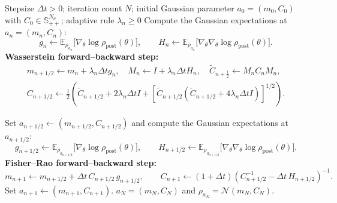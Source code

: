 \documentclass[11pt]{article}
\theoremstyle{plain}
\theoremstyle{definition}
\theoremstyle{remark}
\newcommand{\N}{\mathcal{N}}
\newcommand{\E}{\mathbb{E}}
\newcommand{\post}{\mathrm{post}}
\begin{document}
\begin{algorithm}[t]
\caption{Forward--backward algorithm of Gaussian approximate Wasserstein--Fisher--Rao gradient flow}
\label{alg:fb-fb-wfr-gvi}
\begin{algorithmic}[1]
\Require Stepsize $\Delta t>0$; iteration count $N$; initial Gaussian parameter $a_0=(m_0,C_0)$ with $C_0\in\mathbb S_{++}^{N_\theta}$; adaptive rule $\lambda_n\ge 0$
    \State Compute the Gaussian expectations at $a_n=(m_n,C_n)$:
    \[
        g_n \gets 
        \E_{\rho_{a_n}}
        \bigl[
            \nabla_\theta \log \rho_\post(\theta)
        \bigr],
        \qquad
        H_n \gets 
        \E_{\rho_{a_n}}
        \bigl[
            \nabla_\theta\nabla_\theta \log \rho_\post(\theta)
        \bigr].
    \]
    \State \textbf{Wasserstein forward--backward step:}
    \begin{align*}
        m_{n+1/2} \gets m_n+\lambda_n\Delta t g_n,\quad M_n \gets I+\lambda_n\Delta t H_n, \quad \widetilde C_{n+\frac12} \gets M_n C_n M_n, 
        \\
        C_{n+1/2}
        \gets
        \frac12
        \left(
            \widetilde C_{n+1/2}
            +
            2 \lambda_n\Delta t I
            +
            \left[
                \widetilde C_{n+1/2}
                \left(
                    \widetilde C_{n+1/2}
                    +
                    4 \lambda_n\Delta t I
                \right)
            \right]^{1/2}
        \right).
    \end{align*}

    \State Set $a_{n+1/2} \gets (m_{n+1/2},C_{n+1/2})$ and compute the Gaussian expectations at $a_{n+1/2}$:
    \[
        g_{n+1/2}
        \gets
        \E_{\rho_{a_{n+1/2}}}
        \bigl[
            \nabla_\theta \log \rho_\post(\theta)
        \bigr],
        \qquad
        H_{n+1/2}
        \gets
        \E_{\rho_{a_{n+1/2}}}
        \bigl[
            \nabla_\theta\nabla_\theta \log \rho_\post(\theta)
        \bigr].
    \]
    \State \textbf{Fisher--Rao forward--backward step:}
    \[
        m_{n+1}
        \gets
        m_{n+1/2}
        +
        \Delta t\, C_{n+1/2} \, g_{n+1/2},
        \qquad 
        C_{n+1}
        \gets
        (1+\Delta t)
        \left(
            C_{n+1/2}^{-1}
            -
            \Delta t\, H_{n+1/2}
        \right)^{-1}.
    \]
    \State Set $a_{n+1}\gets (m_{n+1},C_{n+1})$.
\EndFor
\State \Return $a_N=(m_N,C_N)$ and $\rho_{a_N}=\N (m_N,C_N)$.
\end{algorithmic}
\end{algorithm}
\end{document}
